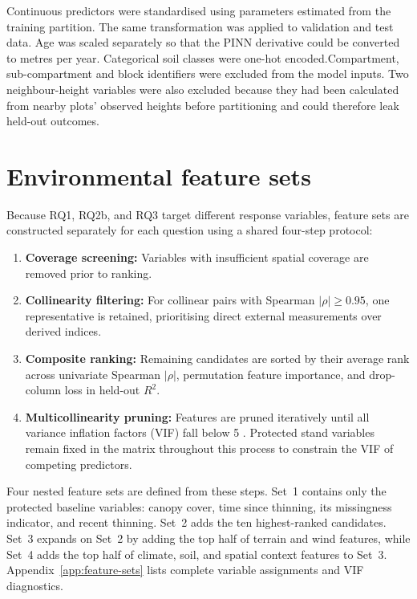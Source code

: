 \documentclass[logo,msc,ai]{infthesis}           %
\begin{document}
Continuous predictors were standardised using parameters estimated from the training partition. The same transformation was applied to validation and test data. Age was scaled separately so that the PINN derivative could be converted to metres per year. Categorical soil classes were one-hot encoded.Compartment, sub-compartment and block identifiers were excluded from the model inputs. Two neighbour-height variables were also excluded because they had been calculated from nearby plots' observed heights before partitioning and could therefore leak held-out outcomes.

\section{Environmental feature sets}

Because RQ1, RQ2b, and RQ3 target different response variables, feature sets are constructed separately for each question using a shared four-step protocol:

\begin{enumerate}
\setlength\itemsep{0pt}
\item \textbf{Coverage screening:} Variables with insufficient spatial coverage are removed prior to ranking.
\item \textbf{Collinearity filtering:} For collinear pairs with Spearman $|\rho| \ge 0.95$, one representative is retained, prioritising direct external measurements over derived indices.
\item \textbf{Composite ranking:} Remaining candidates are sorted by their average rank across univariate Spearman $|\rho|$, permutation feature importance, and drop-column loss in held-out $R^2$.
\item \textbf{Multicollinearity pruning:} Features are pruned iteratively until all variance inflation factors (VIF) fall below 5 \cite{obrien2007Caution_C5_EVAL}. Protected stand variables remain fixed in the matrix throughout this process to constrain the VIF of competing predictors.
\end{enumerate}

Four nested feature sets are defined from these steps. Set~1 contains only the protected baseline variables: canopy cover, time since thinning, its missingness indicator, and recent thinning. Set~2 adds the ten highest-ranked candidates. Set~3 expands on Set~2 by adding the top half of terrain and wind features, while Set~4 adds the top half of climate, soil, and spatial context features to Set~3. Appendix~\ref{app:feature-sets} lists complete variable assignments and VIF diagnostics.
\end{document}
